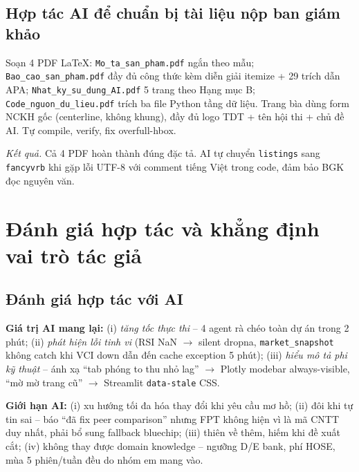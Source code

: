 \documentclass[12pt,a4paper]{article}
\begin{document}
\subsection{Hợp tác AI để chuẩn bị tài liệu nộp ban giám khảo}

\begin{promptbox}
\footnotesize Soạn 4 PDF LaTeX: \texttt{Mo\_ta\_san\_pham.pdf} ngắn theo mẫu; \texttt{Bao\_cao\_san\_pham.pdf} đầy đủ công thức kèm diễn giải itemize + 29 trích dẫn APA; \texttt{Nhat\_ky\_su\_dung\_AI.pdf} 5 trang theo Hạng mục B; \texttt{Code\_nguon\_du\_lieu.pdf} trích ba file Python tầng dữ liệu. Trang bìa dùng form NCKH gốc (centerline, không khung), đầy đủ logo TDT + tên hội thi + chủ đề AI. Tự compile, verify, fix overfull-hbox.
\end{promptbox}

\textit{Kết quả.} Cả 4 PDF hoàn thành đúng đặc tả. AI tự chuyển \texttt{listings} sang \texttt{fancyvrb} khi gặp lỗi UTF-8 với comment tiếng Việt trong code, đảm bảo BGK đọc nguyên văn.

\section{Đánh giá hợp tác và khẳng định vai trò tác giả}

\subsection{Đánh giá hợp tác với AI}

\textbf{Giá trị AI mang lại:} (i) \textit{tăng tốc thực thi} -- 4 agent rà chéo toàn dự án trong 2 phút; (ii) \textit{phát hiện lỗi tinh vi} (RSI NaN $\to$ silent dropna, \texttt{market\_snapshot} không catch khi VCI down dẫn đến cache exception 5 phút); (iii) \textit{hiểu mô tả phi kỹ thuật} -- ánh xạ ``tab phóng to thu nhỏ lag'' $\to$ Plotly modebar always-visible, ``mờ mờ trang cũ'' $\to$ Streamlit \texttt{data-stale} CSS.

\textbf{Giới hạn AI:} (i) xu hướng tối đa hóa thay đổi khi yêu cầu mơ hồ; (ii) đôi khi tự tin sai -- báo ``đã fix peer comparison'' nhưng FPT không hiện vì là mã CNTT duy nhất, phải bổ sung fallback bluechip; (iii) thiên về thêm, hiếm khi đề xuất cắt; (iv) không thay được domain knowledge -- ngưỡng D/E bank, phí HOSE, mùa 5 phiên/tuần đều do nhóm em mang vào.
\end{document}
